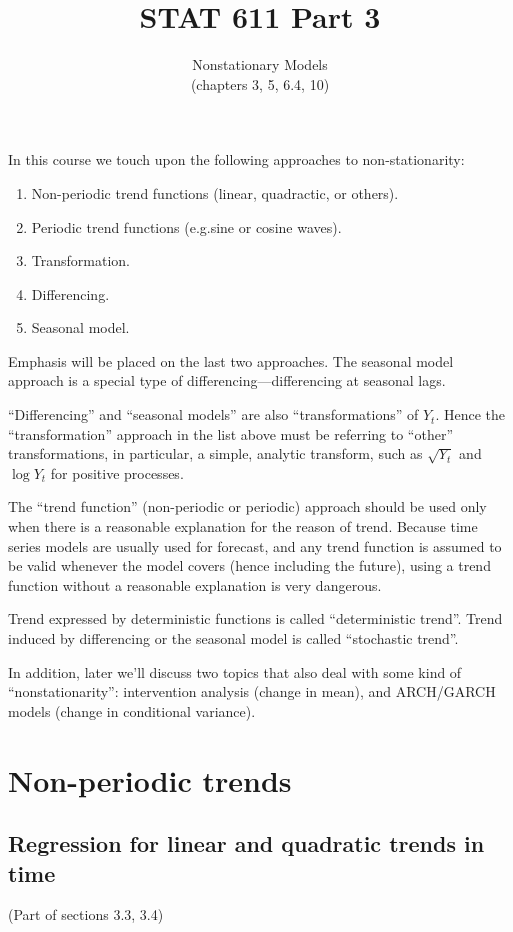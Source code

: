 \documentclass[12pt]{article}
\begin{document}
\title{STAT 611 Part 3}
\subtitle{Nonstationary Models\\
{\normalsize (chapters 3, 5, 6.4, 10)}}
\maketitle

In this course we touch upon the following approaches to non-stationarity:
\begin{enumerate}
\item Non-periodic trend functions (linear, quadractic, or others).
\item Periodic trend functions (e.g.\@ sine or cosine waves).
\item Transformation.
\item Differencing.
\item Seasonal model.
\end{enumerate}

Emphasis will be placed on the last two approaches.
The seasonal model approach is a special type of
differencing---differencing at seasonal lags.

``Differencing'' and ``seasonal models''
are also ``transformations'' of $Y_t$.
Hence the ``transformation'' approach in the list above must be
referring to ``other'' transformations,
in particular,  a simple, analytic transform,
such as
$\sqrt{Y_t}$ and $\log Y_t$ for positive processes.

The ``trend function'' (non-periodic or periodic) approach
should be used only
when there is a reasonable explanation for the reason of trend.
Because time series models are usually used for forecast,
and any trend function is assumed to be valid whenever the model
covers (hence including the future),
using a trend function without a reasonable explanation is very
dangerous.

Trend expressed by deterministic functions is called
``deterministic trend''.
Trend induced by differencing or the seasonal model
is called ``stochastic trend''.

In addition,
later we'll discuss two topics that also deal with some kind of
``nonstationarity'': intervention analysis (change in mean),
and ARCH/GARCH models (change in conditional variance).

\section{Non-periodic trends}


\subsection{Regression for linear and quadratic trends in time}
(Part of sections 3.3, 3.4)
\end{document}
